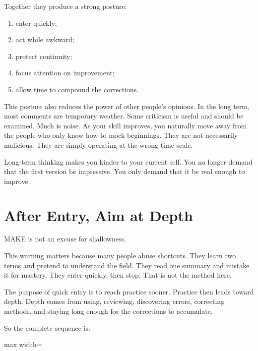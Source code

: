 Together they produce a strong posture:

\begin{enumerate}
\item enter quickly;
\item act while awkward;
\item protect continuity;
\item focus attention on improvement;
\item allow time to compound the corrections.
\end{enumerate}

This posture also reduces the power of other people's opinions. In the long term, most comments are temporary weather. Some criticism is useful and should be examined. Much is noise. As your skill improves, you naturally move away from the people who only know how to mock beginnings. They are not necessarily malicious. They are simply operating at the wrong time scale.

Long-term thinking makes you kinder to your current self. You no longer demand that the first version be impressive. You only demand that it be real enough to improve.

\section*{After Entry, Aim at Depth}

MAKE is not an excuse for shallowness.

This warning matters because many people abuse shortcuts. They learn two terms and pretend to understand the field. They read one summary and mistake it for mastery. They enter quickly, then stop. That is not the method here.

The purpose of quick entry is to reach practice sooner. Practice then leads toward depth. Depth comes from using, reviewing, discovering errors, correcting methods, and staying long enough for the corrections to accumulate.

So the complete sequence is:

\begin{center}
\begin{adjustbox}{max width=\linewidth}
\end{adjustbox}
\end{center}

